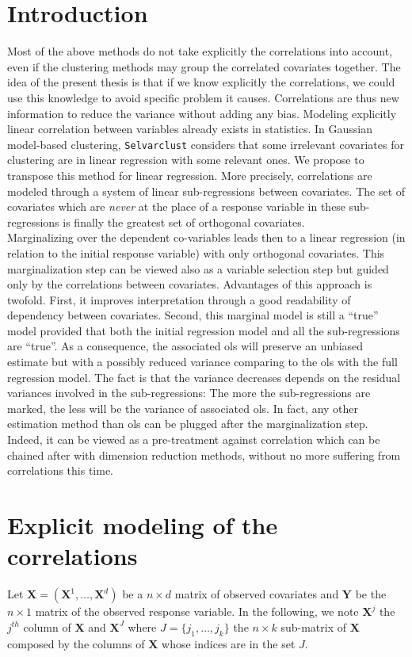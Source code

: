 \documentclass[12pt,a4paper]{report}
\begin{document}
\section{Introduction}
Most of the above methods do not take explicitly the correlations into account, even if the clustering methods may group the correlated covariates together.
The idea of the present thesis is that if we know explicitly the correlations, we could use this knowledge to avoid specific problem it causes. Correlations are thus new information to reduce the variance without adding any bias. 
Modeling explicitly linear correlation between variables already exists in statistics. In Gaussian model-based clustering, {\tt Selvarclust} \cite{maugis2009variable} considers that some irrelevant covariates for clustering are in linear regression with some relevant ones.
 We propose to transpose this method for linear regression.
More precisely, correlations are modeled through a system of linear sub-regressions between covariates. The set of covariates which are {\it never} at the place of a response variable in these sub-regressions is finally the greatest set of orthogonal covariates.\\

 Marginalizing over the dependent co-variables leads then to a linear regression (in relation to the initial response variable) with only orthogonal covariates. This marginalization step can be viewed also as a variable selection step but guided only by the correlations between covariates. Advantages of this approach is twofold. First, it improves interpretation through a good readability of dependency between covariates. Second, this marginal model is still a ``true'' model provided that both the initial regression model and all the sub-regressions are ``true''. As a consequence, the associated {\sc ols} will preserve an unbiased estimate but with a possibly reduced variance comparing to the {\sc ols} with the full regression model. The fact is that the variance decreases depends on the residual variances involved in the sub-regressions: The more the sub-regressions are marked, the less will be the variance of associated {\sc ols}. In fact, any other estimation method than {\sc ols} can be plugged after the marginalization step. Indeed, it can be viewed as a pre-treatment against correlation which can be chained after with dimension reduction methods, without no more suffering from correlations this time.

\section{Explicit modeling of the correlations}
	Let $\boldsymbol{X}=(\boldsymbol{X}^1,\dots,\boldsymbol{X}^d)$ be a $n \times d$ matrix of observed covariates and $\boldsymbol{Y}$ be the $n \times 1$ matrix of the observed response variable. In the following, we note $\boldsymbol{X}^j$ the $j^{th}$ column of $\boldsymbol{X}$ and $\boldsymbol{X}^{J}$ where $J=\{j_1,\dots,j_k\}$ the $n\times k$ sub-matrix of $\boldsymbol{X}$ composed by the columns of $\boldsymbol{X}$ whose indices are in the set $J$. 
\\
\end{document}
